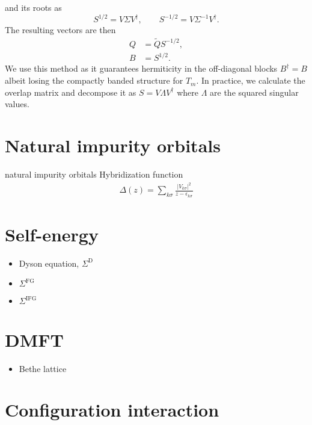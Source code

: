 and its roots as
\begin{equation}
    S^{1/2}  = V \Sigma V^\dagger, \qquad S^{-1/2} = V \Sigma^{-1} V^\dagger.
\end{equation}
The resulting vectors are then
\begin{align}
    Q & = \tilde Q S^{-1/2}, \\
    B & = S^{1/2}.
\end{align}
We use this method as it guarantees hermiticity in the off-diagonal blocks $B^\dag = B$
albeit losing the compactly banded structure for $T_m$.
In practice, we calculate the overlap matrix and decompose it as $S = V \Lambda V^\dag$
where $\Lambda$ are the squared singular values.

\section{Natural impurity orbitals}

natural impurity orbitals
Hybridization function
\begin{align}
    \Delta(z) = \sum_{k\sigma} \frac{|V_{k\sigma}|^2}{z - \epsilon_{k\sigma}}
\end{align}

\section{Self-energy}

\begin{itemize}
    \item Dyson equation, $\Sigma^\mathrm{D}$
    \item $\Sigma^\mathrm{FG}$
    \item $\Sigma^\mathrm{IFG}$
\end{itemize}

\section{DMFT}

\begin{itemize}
    \item Bethe lattice
\end{itemize}

\section{Configuration interaction}
